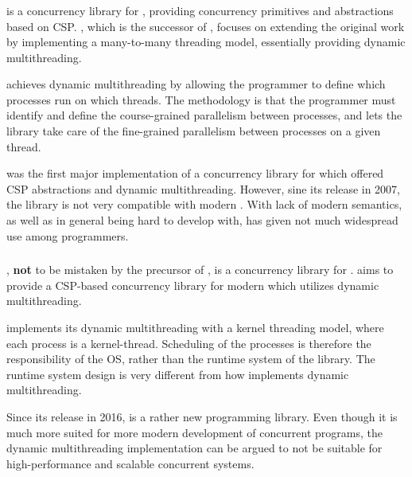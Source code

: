 \subsubsection{}


 \citep{brown2007c++csp2} is a concurrency library for \Cpp, providing concurrency primitives and abstractions based on CSP. , which is the successor of \Cppcsp{} \citep{brown2003c++csp}, focuses on extending the original work by implementing a many\hyp{}to\hyp{}many threading model, essentially providing dynamic multithreading.

 achieves dynamic multithreading by allowing the programmer to define which processes run on which threads. The methodology is that the programmer must identify and define the course\hyp{}grained parallelism between processes, and lets the library take care of the fine\hyp{}grained parallelism between processes on a given thread.

 was the first major implementation of a concurrency library for \Cpp{} which offered CSP abstractions and dynamic multithreading. However, sine its release in 2007, the library is not very compatible with modern \Cpp{}. With lack of modern \Cpp{} semantics, as well as in general being hard to develop with, has given  not much widespread use among \Cpp{} programmers.


\subsubsection{\Cppcsp{}}


\Cppcsp{} \citep{chalmers2016cppcsp}, \textbf{not} to be mistaken by the precursor of , is a concurrency library for \Cpp{}. \Cppcsp{} aims to provide a CSP\hyp{}based concurrency library for modern \Cpp{} which utilizes dynamic multithreading.

\Cppcsp{} implements its dynamic multithreading with a kernel threading model, where each process is a kernel\hyp{}thread. Scheduling of the processes is therefore the responsibility of the OS, rather than the runtime system of the library. The runtime system design is very different from how  implements dynamic multithreading.

Since its release in 2016, \Cppcsp{} is a rather new programming library. Even though it is much more suited for more modern development of concurrent \Cpp{} programs, the dynamic multithreading implementation can be argued to not be suitable for high\hyp{}performance and scalable concurrent systems.


